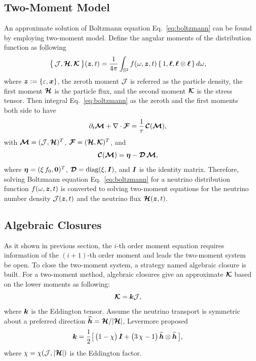 \subsection{Two-Moment Model}
An approximate solution of Boltzmann equation Eq.~\eqref{eq:boltzmann} can be found by employing two-moment model.
Define the angular moments of the distribution function as following
\begin{equation}
  \big\{\,\mathcal{J},\boldsymbol{\mathcal{H}},\boldsymbol{\mathcal{K}}\,\big\}(\boldsymbol{z},t)
  =\frac{1}{4\pi}\int_{\mathbb{S}^{2}}f(\omega,\boldsymbol{z},t)\,\{\,1,\boldsymbol{\ell},\boldsymbol{\ell}\otimes\boldsymbol{\ell}\,\}\,d\omega,
  \label{eq:angularMoments}
\end{equation}
where $\boldsymbol{z}:=\{\varepsilon,\boldsymbol{x}\}$, the zeroth moment $\mathcal{J}$ is referred as the particle density, the first moment $\boldsymbol{\mathcal{H}}$ is the particle flux, and the second moment $\boldsymbol{\mathcal{K}}$ is the stress tensor.
Then integral Eq.~\eqref{eq:boltzmann} as the zeroth and the first moments both side to have
\begin{equation}
  \partial_{t}{\boldsymbol{\mathcal{M}}}+\nabla\cdot\boldsymbol{\mathcal{F}}=\frac{1}{\tau}\,\boldsymbol{\mathcal{C}}(\boldsymbol{\mathcal{M}}),
  \label{eq:momentEquations}
\end{equation}
with $\boldsymbol{\mathcal{M}}=(\mathcal{J},\boldsymbol{\mathcal{H}})^{T}$, $\boldsymbol{\mathcal{F}}=(\boldsymbol{\mathcal{H}},\boldsymbol{\mathcal{K}})^{T}$, and
\begin{equation}
  \boldsymbol{\mathcal{C}}(\boldsymbol{\mathcal{M}})=\boldsymbol{\eta}-\boldsymbol{\mathcal{D}}\,\boldsymbol{\mathcal{M}},
  \label{eq:collisionTermMoments}
\end{equation}
where $\boldsymbol{\eta}=(\xi\,f_{0},\boldsymbol{0})^{T}$, $\boldsymbol{\mathcal{D}}=\mbox{diag}(\xi,\boldsymbol{I})$, and
$\boldsymbol{I}$ is the identity matrix.
Therefore, solving Boltzmann equation Eq.~\eqref{eq:boltzmann} for a neutrino distribution function $f(\omega,\boldsymbol{z},t)$ is converted to solving two-moment equations for the neutrino number density $\mathcal{J}(\boldsymbol{z},t)$ and the neutrino flux $\boldsymbol{\mathcal{H}}(\boldsymbol{z},t)$.

\subsection{Algebraic Closures }
As it shown in previous section, the $i$-th order moment equation requires information of the $(i+1)$-th order moment and leads the two-moment system be open. 
To close the two-moment system, a strategy named algebraic closure is built.
For a two-moment method, algebraic closures give an approximate $\boldsymbol{\mathcal{K}}$ based on the lower moments as following:
\begin{equation}
\boldsymbol{\mathcal{K}} = \boldsymbol{k} \mathcal{J},
\end{equation}
where $\boldsymbol{k}$ is the Eddington tensor.
Assume the neutrino transport is symmetric about a preferred direction $\widehat{\boldsymbol{h}}=\boldsymbol{\mathcal{H}}/|\boldsymbol{\mathcal{H}}|$, Levermore\cite{levermore_1984} proposed
\begin{equation}
  \boldsymbol{k}=\frac{1}{2}\big[\,\big(1-\chi\big)\,\boldsymbol{I}+\big(3\,\chi-1\big)\,\widehat{\boldsymbol{h}}\otimes\widehat{\boldsymbol{h}}\,\big],
  \label{eq:eddingtonTensor}
\end{equation}
where $\chi=\chi(\mathcal{J},|\boldsymbol{\mathcal{H}}|)$ is the Eddington factor. 

